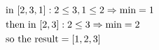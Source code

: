 \documentclass[preview]{standalone}
\begin{document}
\begin{align*}
\special{dvisvgm:raw <g id='unique000'>}\begin{aligned}&\text{in } [2, 3, 1]: 2 \le 3, 1 \le 2 \Rightarrow \text{min} = 1\\&\text{then in } [2, 3]: 2 \le 3 \Rightarrow \text{min} = 2\\&\text{so the result} = [1, 2, 3]\end{aligned}\special{dvisvgm:raw </g>}
\end{align*}
\end{document}
